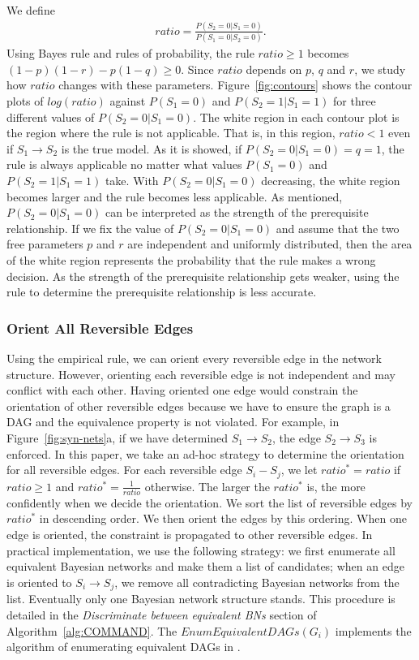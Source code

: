 \documentclass{edm_template}
\begin{document}
We define
\begin{align}
ratio=\frac{P(S_2=0|S_1=0)}{P(S_1=0|S_2=0)}.
\end{align}
Using Bayes rule and rules of probability, the rule $ratio\ge 1$ becomes $(1-p)(1-r)-p(1-q)\ge 0$.
Since $ratio$ depends on $p$, $q$ and $r$, we study how $ratio$ changes with these parameters.
Figure~\ref{fig:contours} shows the contour plots of $log(ratio)$ against $P(S_1=0)$ and $P(S_2=1|S_1=1)$ for three different values of $P(S_2=0|S_1=0)$.
The white region in each contour plot is the region where the rule is not applicable. 
That is, in this region, $ratio<1$ even if $S_1\rightarrow S_2$ is the true model.
As it is showed, if $P(S_2=0|S_1=0)=q=1$, 
the rule is always applicable no matter what values $P(S_1=0)$ and $P(S_2=1|S_1=1)$ take.
With $P(S_2=0|S_1=0)$ decreasing, the white region becomes larger and the rule becomes less applicable.
As mentioned, $P(S_2=0|S_1=0)$ can be interpreted as the strength of the prerequisite relationship. 
If we fix the value of $P(S_2=0|S_1=0)$ and assume that the two free parameters $p$ and $r$ are independent and uniformly distributed, then the area of the white region represents the probability that the rule makes a wrong decision.
As the strength of the prerequisite relationship  gets weaker, using the rule to determine the prerequisite relationship is less accurate.

\subsubsection{Orient All Reversible Edges}
Using the empirical rule, we can orient every reversible edge in the network structure. 
However, orienting each reversible edge is not independent and may conflict with each other.
Having oriented one edge would constrain the orientation of other reversible edges because we have to ensure the graph is a DAG and the equivalence property is not violated.
For example, in Figure~\ref{fig:syn-nets}a, if we have determined $S_1\rightarrow S_2$, the edge $S_2\rightarrow S_3$ is enforced.
In this paper, we take an ad-hoc strategy to determine the orientation for all reversible edges. 
For each reversible edge $S_i-S_j$, we let $ratio^*=ratio$ if $ratio \ge 1$ and $ratio^*=\frac{1}{ratio}$ otherwise. 
The larger the $ratio^*$ is, the more confidently when we decide the orientation.
We sort the list of reversible edges by $ratio^*$ in descending order. We then orient the edges by this ordering.
When one edge is oriented, the constraint is propagated to other reversible edges. In practical implementation, we use the following strategy: 
we first enumerate all equivalent Bayesian networks and make them a list of candidates; 
when an edge is oriented to $S_i\rightarrow S_j$, we remove all contradicting Bayesian networks from the list.
Eventually only one Bayesian network structure stands. This procedure is detailed in the \emph{Discriminate between equivalent BNs} section of Algorithm~\ref{alg:COMMAND}.  
The $EnumEquivalentDAGs(G_i)$ implements the algorithm of enumerating equivalent DAGs in \cite{chen2014finding}.
\end{document}
